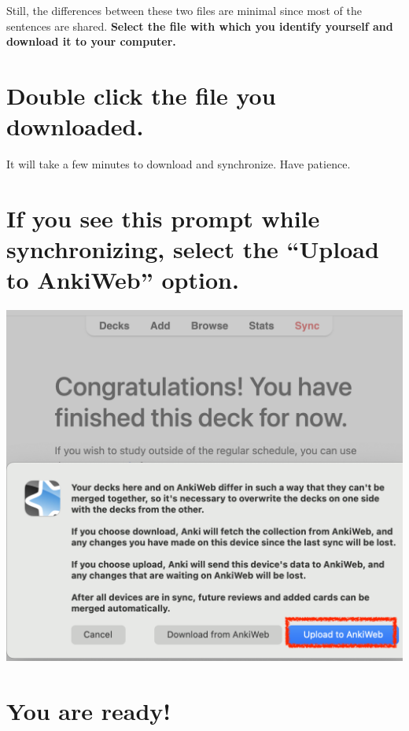 \documentclass[
]{book}
\begin{document}
Still, the differences between these two files are minimal since most of the sentences are shared. \textbf{Select the file with which you identify yourself and download it to your computer.}

\hypertarget{double-click-the-file-you-downloaded.}{%
\section{Double click the file you downloaded.}\label{double-click-the-file-you-downloaded.}}

It will take a few minutes to download and synchronize. Have patience.

\hypertarget{if-you-see-this-prompt-while-synchronizing-select-the-upload-to-ankiweb-option.}{%
\section*{If you see this prompt while synchronizing, select the ``Upload to AnkiWeb'' option.}\label{if-you-see-this-prompt-while-synchronizing-select-the-upload-to-ankiweb-option.}}

\includegraphics[width=1\linewidth]{images/reposit_en/subir_a_anki}

\hypertarget{you-are-ready}{%
\section{You are ready!}\label{you-are-ready}}
\end{document}
